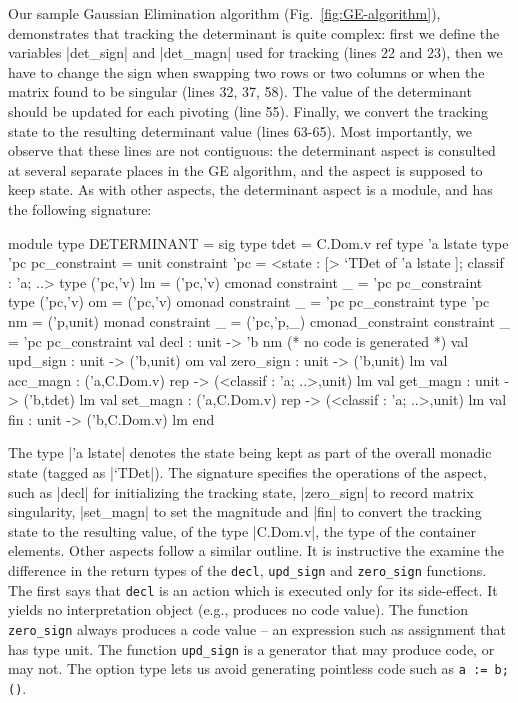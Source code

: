 \documentclass{elsart}
\newcommand{\oleg}[1]{{\it [Oleg says: #1]}}
\newcommand{\jacques}[1]{{\it [Jacques says: #1]}}
\begin{document}
Our sample Gaussian Elimination algorithm (Fig.~\ref{fig:GE-algorithm}),
demonstrates that tracking the determinant is quite complex: first we define
the variables |det_sign| and |det_magn| used for tracking (lines 22 and
23), then we have to change the sign when swapping two rows or two
columns or when the matrix found to be singular (lines 32, 37, 58).
The value of the determinant should be updated for each pivoting (line
55). Finally, we convert the tracking state to the resulting
determinant value (lines 63-65). Most importantly, we observe that these lines
are not contiguous: the determinant aspect is consulted at several separate
places in the GE algorithm, and the aspect is supposed to keep
state. As with other aspects, the determinant aspect is a module,
and has the following signature:
\begin{code}
module type DETERMINANT = sig
  type tdet = C.Dom.v ref
  type 'a lstate
  type 'pc pc_constraint = unit
    constraint 'pc = <state : [> `TDet of 'a lstate ]; classif : 'a; ..>
  type ('pc,'v) lm = ('pc,'v) cmonad
    constraint _  = 'pc pc_constraint
  type ('pc,'v) om = ('pc,'v) omonad
    constraint _  = 'pc pc_constraint
  type 'pc nm = ('p,unit) monad
    constraint _ = ('pc,'p,_) cmonad_constraint
    constraint _ = 'pc pc_constraint
  val decl : unit -> 'b nm (* no code is generated *)
  val upd_sign  : unit -> ('b,unit) om
  val zero_sign : unit -> ('b,unit) lm
  val acc_magn  : ('a,C.Dom.v) rep -> (<classif : 'a; ..>,unit) lm
  val get_magn  : unit -> ('b,tdet) lm
  val set_magn  : ('a,C.Dom.v) rep -> (<classif : 'a; ..>,unit) lm
  val fin       : unit -> ('b,C.Dom.v) lm
end
\end{code}
The type |'a lstate| denotes the state being kept as part of the
overall monadic state (tagged as |`TDet|). The signature specifies the
operations of the aspect, such as |decl| for initializing the tracking
state, |zero_sign| to record matrix singularity, |set_magn| to set the
magnitude and |fin| to convert the tracking state to the resulting
value, of  the type |C.Dom.v|, the type of the container
elements. Other aspects follow a similar outline.
It is instructive the examine the difference in the return types of the
\texttt{decl}, \texttt{upd\_sign} and \texttt{zero\_sign} functions. The first
says that \texttt{decl} is an action which is executed only for its
side-effect. It yields no interpretation object (e.g., produces no
code value). The function \texttt{zero\_sign} always produces a code
value -- an expression such as assignment that has type unit. 
The function \texttt{upd\_sign} is a generator that may produce code, or may
not. The option type lets us avoid generating pointless code such as 
\texttt{a := b; ()}.
\end{document}
